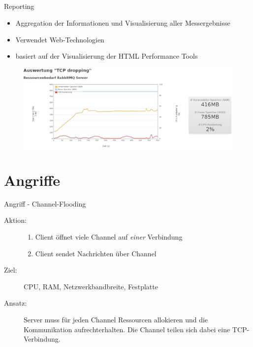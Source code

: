 \documentclass[10pt]{beamer}
\begin{document}
\subsection{}

\begin{frame}{Reporting}
	\centering
	\begin{itemize}
		\item Aggregation der Informationen und Visualisierung aller Messergebnisse
		\item Verwendet Web-Technologien
		\item basiert auf der Visualisierung der HTML Performance Tools
	\end{itemize}
  
	\begin{figure}[!htb]
		\centering
 		\includegraphics[width=\textwidth]{pic/reporting.png}
	\end{figure}
\end{frame}




\section{Angriffe}

\begin{frame}[t]{Angriff - Channel-Flooding}
\begin{description}
	\item[Aktion:]
		\begin{enumerate}
			\item Client öffnet viele Channel auf \textsl{einer} Verbindung
			\item Client sendet Nachrichten über Channel
		\end{enumerate} \smallskip
	\item[Ziel:] CPU, RAM, Netzwerkbandbreite, Festplatte \smallskip
	\item[Ansatz:] Server muss für jeden Channel Ressourcen allokieren und die Kommunikation aufrechterhalten. Die Channel teilen sich dabei eine TCP-Verbindung.
\end{description}
\end{frame}
\end{document}
